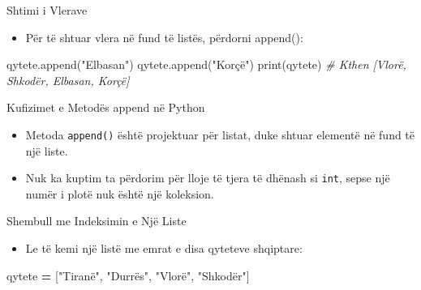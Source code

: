 \documentclass[
  ignorenonframetext,
]{beamer}
\newenvironment{Shaded}{\begin{snugshade}}{\end{snugshade}}
\newcommand{\BuiltInTok}[1]{#1}
\newcommand{\CommentTok}[1]{\textcolor[rgb]{0.56,0.35,0.01}{\textit{#1}}}
\newcommand{\NormalTok}[1]{#1}
\newcommand{\OperatorTok}[1]{\textcolor[rgb]{0.81,0.36,0.00}{\textbf{#1}}}
\newcommand{\StringTok}[1]{\textcolor[rgb]{0.31,0.60,0.02}{#1}}
\providecommand{\tightlist}{%
  \setlength{\itemsep}{0pt}\setlength{\parskip}{0pt}}
\begin{document}
\begin{frame}[fragile]{Shtimi i Vlerave}
\protect\hypertarget{shtimi-i-vlerave}{}
\begin{itemize}
\tightlist
\item
  Për të shtuar vlera në fund të listës, përdorni append():
\end{itemize}

\begin{Shaded}
\begin{Highlighting}[]
\NormalTok{qytete.append(}\StringTok{"Elbasan"}\NormalTok{)}
\NormalTok{qytete.append(}\StringTok{"Korçë"}\NormalTok{)}
\BuiltInTok{print}\NormalTok{(qytete)  }\CommentTok{\# Kthen [\textquotesingle{}Vlorë\textquotesingle{}, \textquotesingle{}Shkodër\textquotesingle{}, \textquotesingle{}Elbasan\textquotesingle{}, \textquotesingle{}Korçë\textquotesingle{}]}
\end{Highlighting}
\end{Shaded}
\end{frame}

\begin{frame}[fragile]{Kufizimet e Metodës append në Python}
\protect\hypertarget{kufizimet-e-metoduxebs-append-nuxeb-python}{}
\begin{itemize}
\item
  Metoda \texttt{append()} është projektuar për listat, duke shtuar
  elementë në fund të një liste.
\item
  Nuk ka kuptim ta përdorim për lloje të tjera të dhënash si
  \texttt{int}, sepse një numër i plotë nuk është një koleksion.
\end{itemize}
\end{frame}

\begin{frame}[fragile]{Shembull me Indeksimin e Një Liste}
\protect\hypertarget{shembull-me-indeksimin-e-njuxeb-liste}{}
\begin{itemize}
\tightlist
\item
  Le të kemi një listë me emrat e disa qyteteve shqiptare:
\end{itemize}

\begin{Shaded}
\begin{Highlighting}[]
\NormalTok{  qytete }\OperatorTok{=}\NormalTok{ [}\StringTok{"Tiranë"}\NormalTok{, }\StringTok{"Durrës"}\NormalTok{, }\StringTok{"Vlorë"}\NormalTok{, }\StringTok{"Shkodër"}\NormalTok{]}
\end{Highlighting}
\end{Shaded}
\end{frame}
\end{document}
